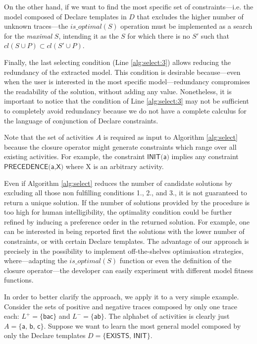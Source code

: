 On the other hand, if we want to find the most specific set of constraints---i.e. the model composed of Declare templates in $D$ that excludes the higher number of unknown traces---the $is\_optimal(S)$ operation must be implemented as a search for the \emph{maximal} $S$, intending it as the $S$ for which there is no $S'$ such that ${cl}(S \cup P) \subset {cl}(S' \cup P)$.

Finally, the last selecting condition (Line \ref{alg:select:3}) allows reducing the redundancy of the extracted model. This condition is desirable because---even when the user is interested in the most specific model---redundancy compromises the readability of the solution, without adding any value. Nonetheless, it is important to notice that the condition of Line \ref{alg:select:3} may not be sufficient to completely avoid redundancy because we do not have a complete calculus for the language of conjunction of Declare constraints.

Note that the set of activities $A$ is required as input to Algorithm \ref{alg:select} because the closure operator might generate constraints which range over all existing activities. For example, the constraint  $\textsf{INIT(a)}$ implies any constraint $\textsf{PRECEDENCE(a,X)}$ where \textsf{X} is an arbitrary activity.

Even if Algorithm \ref{alg:select} reduces the number of candidate solutions by excluding all those non fulfilling conditions 1., 2., and 3., it is not guaranteed to return a unique solution. If the number of solutions provided by the procedure is too high for human intelligibility, the optimality condition could be further refined by inducing a preference order in the returned solution. For example, one can be interested in being reported first the solutions with the lower number of constraints, or with certain Declare templates. The advantage of our approach is precisely in the possibility to implement off-the-shelves optimisation strategies, where---adapting the $is\_optimal(S)$ function or even the definition of the closure operator---the developer can easily experiment with different model fitness functions.

In order to better clarify the approach, we apply it to a very simple example.  
Consider the sets of positive and negative traces composed by only one trace each: $L^+=\{\textsf{bac}\}$ and $L^-=\{\textsf{ab}\}$. The alphabet of activities is clearly just $A=\{\textsf{a, b, c}\}$. Suppose we want to learn the most general model composed by only the Declare templates $D=\{\textsf{EXISTS, INIT}\}$.

